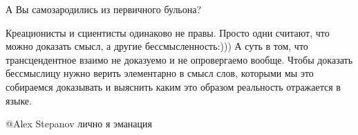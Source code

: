 \begin{multicols}{2}
\begin{itemize} %

А Вы самозародились из первичного бульона?


Креационисты и сциентисты одинаково не правы. Просто одни считают, что можно
доказать смысл, а другие бессмысленность:))) А суть в том, что трансцендентное
взаимо не доказуемо и не опровергаемо  вообще. Чтобы доказать бессмыслицу нужно
верить элементарно в смысл слов, которыми мы это собираемся доказывать и
выяснить каким это образом реальность отражается в языке.

 @Alex Stepanov  лично я эманация
\end{itemize} %

\end{multicols} %
